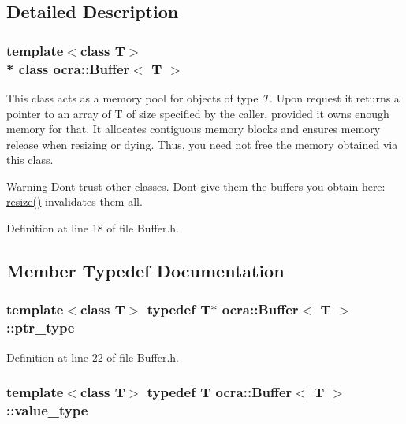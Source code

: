 \subsection{Detailed Description}
\subsubsection*{template$<$class T$>$\\*
class ocra\+::\+Buffer$<$ T $>$}

This class acts as a memory pool for objects of type {\itshape T}. Upon request it returns a pointer to an array of T of size specified by the caller, provided it owns enough memory for that. It allocates contiguous memory blocks and ensures memory release when resizing or dying. Thus, you need not free the memory obtained via this class.

\begin{DoxyWarning}{Warning}
Don\textquotesingle{}t trust other classes. Don\textquotesingle{}t give them the buffers you obtain here\+: \hyperlink{classocra_1_1Buffer_a171d3ec7b50688fd529c8ae3dff7b6d1}{resize()} invalidates them all. 
\end{DoxyWarning}


Definition at line 18 of file Buffer.\+h.



\subsection{Member Typedef Documentation}
\subsubsection[{\texorpdfstring{ptr\+\_\+type}{ptr_type}}]{\setlength{\rightskip}{0pt plus 5cm}template$<$class T$>$ typedef T$\ast$ {\bf ocra\+::\+Buffer}$<$ T $>$\+::{\bf ptr\+\_\+type}}\hypertarget{classocra_1_1Buffer_a26bf1dc373e2144eddd0dd8be4b37f84}{}\label{classocra_1_1Buffer_a26bf1dc373e2144eddd0dd8be4b37f84}


Definition at line 22 of file Buffer.\+h.

\subsubsection[{\texorpdfstring{value\+\_\+type}{value_type}}]{\setlength{\rightskip}{0pt plus 5cm}template$<$class T$>$ typedef T {\bf ocra\+::\+Buffer}$<$ T $>$\+::{\bf value\+\_\+type}}\hypertarget{classocra_1_1Buffer_ad03bef3764c265411b5b7726d94d8786}{}\label{classocra_1_1Buffer_ad03bef3764c265411b5b7726d94d8786}



